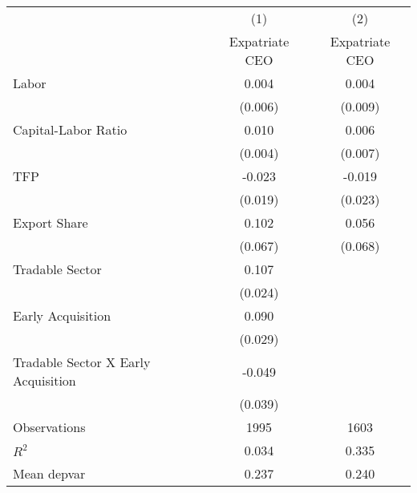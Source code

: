 \begin{tabular}{l*{2}{c}}
\hline\hline
                    &\multicolumn{1}{c}{(1)}&\multicolumn{1}{c}{(2)}\\
                    &\multicolumn{1}{c}{Expatriate CEO}&\multicolumn{1}{c}{Expatriate CEO}\\
\hline
Labor               &       0.004&       0.004\\
                    &     (0.006)&     (0.009)\\
[1em]
Capital-Labor Ratio &       0.010&       0.006\\
                    &     (0.004)&     (0.007)\\
[1em]
TFP                 &      -0.023&      -0.019\\
                    &     (0.019)&     (0.023)\\
[1em]
Export Share        &       0.102&       0.056\\
                    &     (0.067)&     (0.068)\\
[1em]
Tradable Sector     &       0.107&            \\
                    &     (0.024)&            \\
[1em]
Early Acquisition   &       0.090&            \\
                    &     (0.029)&            \\
[1em]
Tradable Sector X Early Acquisition&      -0.049&            \\
                    &     (0.039)&            \\
\hline
Observations        &        1995&        1603\\
\(R^{2}\)           &       0.034&       0.335\\
Mean depvar         &       0.237&       0.240\\
\hline\hline
\end{tabular}
